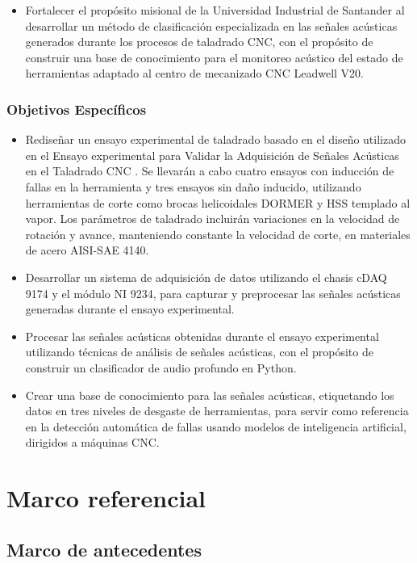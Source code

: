 \documentclass[12pt, letterpaper]{report}
\begin{document}
\begin{itemize}[leftmargin=1.77cm]
\item Fortalecer el propósito misional de la Universidad Industrial de Santander al desarrollar un método de clasificación especializada en las señales acústicas generados durante los procesos de taladrado CNC, con el propósito de construir una base de conocimiento para el monitoreo acústico del estado de herramientas adaptado al centro de mecanizado CNC Leadwell V20.
\end{itemize}
\subsection{Objetivos Específicos}

\begin{itemize}[leftmargin=1.77cm]
\item Rediseñar un ensayo experimental de taladrado basado en el diseño utilizado en el Ensayo experimental para Validar la Adquisición de Señales Acústicas en el Taladrado CNC \cite{orejarena2014}. Se llevarán a cabo cuatro ensayos con inducción de fallas en la herramienta y tres ensayos sin daño inducido, utilizando herramientas de corte como brocas helicoidales DORMER y HSS templado al vapor. Los parámetros de taladrado incluirán variaciones en la velocidad de rotación y avance, manteniendo constante la velocidad de corte, en materiales de acero AISI-SAE 4140.
\item Desarrollar un sistema de adquisición de datos utilizando el chasis cDAQ 9174 y el módulo NI 9234, para capturar y preprocesar las señales acústicas generadas durante el ensayo experimental.
\item Procesar las señales acústicas obtenidas durante el ensayo experimental utilizando técnicas de análisis de señales acústicas, con el propósito de construir un clasificador de audio profundo en Python.
\item Crear una base de conocimiento para las señales acústicas, etiquetando los datos en tres niveles de desgaste de herramientas, para servir como referencia en la detección automática de fallas usando modelos de inteligencia artificial, dirigidos a máquinas CNC.
\end{itemize}
\clearpage
\chapter{Marco referencial}

\section{Marco de antecedentes}
\end{document}
